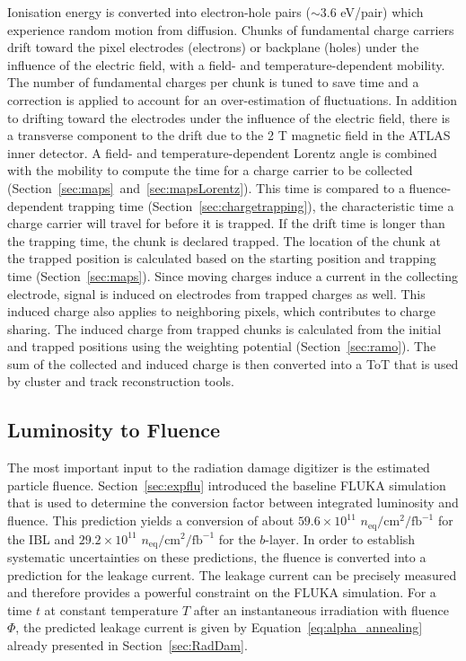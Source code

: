    Ionisation energy is converted into electron-hole pairs ($\sim 3.6$ eV/pair) which experience random motion from diffusion.  Chunks of fundamental charge carriers drift toward the pixel electrodes (electrons) or backplane (holes) under the influence of the electric field, with a field- and temperature-dependent mobility.  The number of fundamental charges per chunk is tuned to save time and a correction is applied to account for an over-estimation of fluctuations.  In addition to drifting toward the electrodes under the influence of the electric field, there is a transverse component to the drift due to the 2 T magnetic field in the ATLAS inner detector.  A field- and temperature-dependent Lorentz angle is combined with the mobility to compute the time for a charge carrier to be collected (Section~\ref{sec:maps}~and~\ref{sec:mapsLorentz}).  This time is compared to a fluence-dependent trapping time (Section~\ref{sec:chargetrapping}), the characteristic time a charge carrier will travel for before it is trapped.  If the drift time is longer than the trapping time, the chunk is declared trapped.  The location of the chunk at the trapped position is calculated based on the starting position and trapping time (Section~\ref{sec:maps}).  Since moving charges induce a current in the collecting electrode, signal is induced on electrodes from trapped charges as well.  This induced charge also applies to neighboring pixels, which contributes to charge sharing.  The induced charge from trapped chunks is calculated from the initial and trapped positions using the weighting potential (Section~\ref{sec:ramo}).  The sum of the collected and induced charge is then converted into a ToT that is used by cluster and track reconstruction tools.



\subsection{Luminosity to Fluence}
\label{sec:fluence}



 The most important input to the radiation damage digitizer is the estimated particle fluence.  
 Section~\ref{sec:expflu} introduced the baseline FLUKA simulation that is used to determine the 
 conversion factor between integrated luminosity and fluence. This prediction yields a conversion of
  about $59.6\times 10^{11}$ $n_\text{eq}/\text{cm}^2/\text{fb}^{-1}$ for the IBL and $29.2\times 10^{11}$ $n_\text{eq}/\text{cm}^2/\text{fb}^{-1}$ for the $b$-layer. In order to establish systematic uncertainties on these predictions, the fluence is converted into a prediction for the leakage current. The leakage 
current can be precisely measured and therefore provides a powerful constraint on the FLUKA simulation. For a time $t$ at constant temperature $T$ after an instantaneous irradiation with fluence $\Phi$, the predicted leakage current is given by Equation~\ref{eq:alpha_annealing} already presented 
in Section~\ref{sec:RadDam}.

